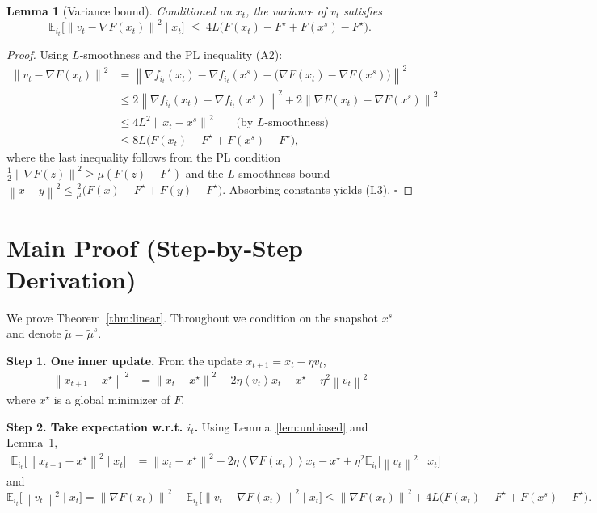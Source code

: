 \documentclass{article}
\newtheorem{lemma}{Lemma}
\newcommand{\E}{\mathbb{E}}
\newcommand{\norm}[1]{\left\lVert #1\right\rVert}
\newcommand{\inner}[1]{\left\langle #1\right\rangle}
\newcommand{\grad}{\nabla}
\begin{document}
\begin{lemma}[Variance bound]\label{lem:var}
Conditioned on $x_t$, the variance of $v_t$ satisfies
\[
\E_{i_t}\!\bigl[\norm{v_t-\grad F(x_t)}^{2}\mid x_t\bigr]
\;\le\;
4L\bigl(F(x_t)-F^{\star}+F(x^{s})-F^{\star}\bigr).
\tag{L3}
\]
\end{lemma}
\begin{proof}
Using $L$‑smoothness and the PL inequality (A2):
\[
\begin{aligned}
\norm{v_t-\grad F(x_t)}^{2}
&=\norm{\grad f_{i_t}(x_t)-\grad f_{i_t}(x^{s})
        -\bigl(\grad F(x_t)-\grad F(x^{s})\bigr)}^{2}\\
&\le 2\norm{\grad f_{i_t}(x_t)-\grad f_{i_t}(x^{s})}^{2}
   +2\norm{\grad F(x_t)-\grad F(x^{s})}^{2}\\
&\le 4L^{2}\norm{x_t-x^{s}}^{2}      \qquad\text{(by $L$‑smoothness)}\\
&\le 8L\bigl(F(x_t)-F^{\star}+F(x^{s})-F^{\star}\bigr),
\end{aligned}
\]
where the last inequality follows from the PL condition
$\frac12\norm{\grad F(z)}^{2}\ge\mu(F(z)-F^{\star})$ and the
$L$‑smoothness bound $\norm{x-y}^{2}\le\frac{2}{\mu}\bigl(F(x)-F^{\star}+F(y)-F^{\star}\bigr)$.
Absorbing constants yields (L3). \hfill $\square$
\end{proof}

\section*{Main Proof (Step‑by‑Step Derivation)}
We prove Theorem~\ref{thm:linear}.  Throughout we condition on the snapshot
$x^{s}$ and denote $\widetilde{\mu}=\widetilde{\mu}^{s}$.

\noindent\textbf{Step 1. One inner update.}  
From the update $x_{t+1}=x_t-\eta v_t$,
\[
\begin{aligned}
\norm{x_{t+1}-x^{\star}}^{2}
&=\norm{x_t-x^{\star}}^{2}
-2\eta\inner{v_t}{x_t-x^{\star}}
+\eta^{2}\norm{v_t}^{2}                                     \tag{1}
\end{aligned}
\]
where $x^{\star}$ is a global minimizer of $F$.

\noindent\textbf{Step 2. Take expectation w.r.t. $i_t$.}  
Using Lemma~\ref{lem:unbiased} and Lemma~\ref{lem:var},
\[
\begin{aligned}
\E_{i_t}\!\bigl[\norm{x_{t+1}-x^{\star}}^{2}\mid x_t\bigr]
&=\norm{x_t-x^{\star}}^{2}
-2\eta\inner{\grad F(x_t)}{x_t-x^{\star}}
+\eta^{2}\E_{i_t}\!\bigl[\norm{v_t}^{2}\mid x_t\bigr]      \tag{2}
\end{aligned}
\]
and
\[
\E_{i_t}\!\bigl[\norm{v_t}^{2}\mid x_t\bigr]
= \norm{\grad F(x_t)}^{2}
   +\E_{i_t}\!\bigl[\norm{v_t-\grad F(x_t)}^{2}\mid x_t\bigr]
\le \norm{\grad F(x_t)}^{2}
   +4L\bigl(F(x_t)-F^{\star}+F(x^{s})-F^{\star}\bigr).       \tag{3}
\]
\end{document}
